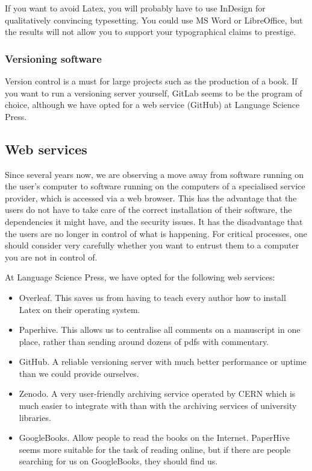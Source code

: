 \documentclass[guidelines,nonflat,modfonts] {langsci/langscibook}
\begin{document}
If you want to avoid Latex, you will probably have to use InDesign for qualitatively convincing typesetting. You could use MS Word or LibreOffice, but the results will not allow you to support your typographical claims to prestige.


\subsubsection{Versioning software}
Version control is a must for large projects such as the production of a book. If you want to run a versioning server yourself, GitLab seems to be the program of choice, although we have opted for a web service (GitHub) at Language Science Press. 

\subsection{Web services}
Since several years now, we are observing a move away from software running on the user's computer to software running on the computers of a specialised service provider, which is accessed via a web browser. This has the advantage that the users do not have to take care of the correct installation of their software, the dependencies it might have, and the security issues. It has the disadvantage that the users are no longer in control of what is happening. For critical processes, one should consider very carefully whether you want to entrust them to a computer you are not in control of. 

At Language Science Press, we have opted for the following web services: 

\begin{itemize}
 \item Overleaf. This saves us from having to teach every author how to install Latex on their operating system. 
 \item Paperhive. This allows us to centralise all comments on a manuscript in one place, rather than sending around dozens of pdfs with commentary. 
 \item GitHub. A reliable versioning server with much better performance or uptime than we could provide ourselves. 
 \item Zenodo. A very user-friendly archiving service operated by CERN which is much easier to integrate with than with the archiving services of university libraries.
 \item GoogleBooks. Allow people to read the books on the Internet. PaperHive seems more suitable for the task of reading online, but if there are people searching for us on GoogleBooks, they should find us. 
\end{itemize}
\end{document}
